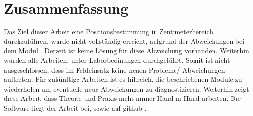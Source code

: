 \newpage
\section{Zusammenfassung}

Das Ziel dieser Arbeit eine Positionsbestimmung in Zentimeterbereich durchzuführen, wurde nicht vollständig erreicht, aufgrund der Abweichungen bei dem Modul \pageref{sec:modul_D}. Derzeit ist keine Lösung für diese Abweichung vorhanden. Weiterhin wurden alle Arbeiten, unter Laborbedinungen durchgeführt. Somit ist nicht ausgeschlossen, dass im Feldeinsatz keine neuen Probleme/ Abweichungen auftreten. Für zukünftige Arbeiten ist es hilfreich, die beschriebenen Module zu wiederholen um eventuelle neue Abweichungen zu diagnostizieren. Weiterhin zeigt diese Arbeit, dass Theorie und Praxis nicht immer Hand in Hand arbeiten. Die Software liegt der Arbeit bei, sowie auf github \cite{src_GITHUB_CODE_BA}.